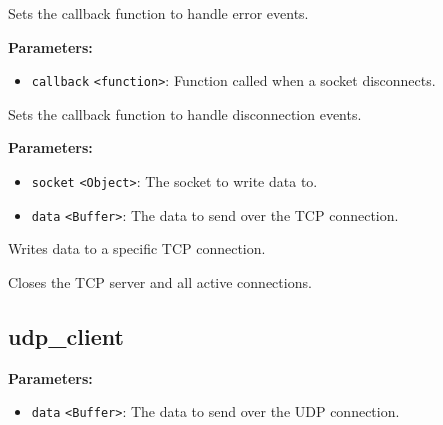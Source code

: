 \documentclass[12pt,a4paper]{article}
\begin{document}
\noindent Sets the callback function to handle error events.

\vspace{5mm}
\noindent {}


\noindent \textbf{Parameters:}
\begin{itemize}
  \item \texttt{callback} \texttt{<function>}: Function called when a socket disconnects.
\end{itemize}

\noindent Sets the callback function to handle disconnection events.

\vspace{5mm}
\noindent {}


\noindent \textbf{Parameters:}
\begin{itemize}
  \item \texttt{socket} \texttt{<Object>}: The socket to write data to.
  \item \texttt{data} \texttt{<Buffer>}: The data to send over the TCP connection.
\end{itemize}

\noindent Writes data to a specific TCP connection.

\vspace{5mm}
\noindent {}


\noindent Closes the TCP server and all active connections.


\subsection{udp\_client}
\vspace{5mm}
\noindent {}


\noindent \textbf{Parameters:}
\begin{itemize}
  \item \texttt{data} \texttt{<Buffer>}: The data to send over the UDP connection.
\end{itemize}
\end{document}
